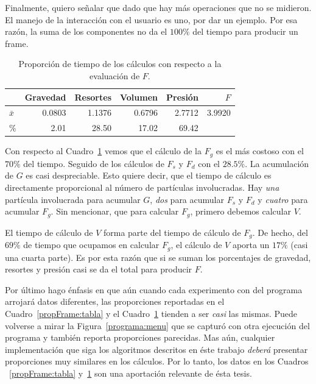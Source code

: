 Finalmente, quiero señalar que dado que hay más operaciones que no se midieron.
El manejo de la interacción con el usuario es uno, por dar un ejemplo.
Por esa razón, la suma de los componentes no da el $100\%$ del tiempo para producir un frame.

\begin{table}
\begin{center}
\begin{tabular} {@{}lrrrrr@{}}
\toprule
& Gravedad & Resortes & Volumen & Presión & $F$ \\ 
\midrule 
 $\bar{x}$      & 0.0803 & 1.1376 & 0.6796 & 2.7712 & 3.9920 \\
 $\%$           & 2.01 & 28.50 & 17.02 & 69.42 & \\
\bottomrule
\end{tabular}
\end{center}
\caption[Proporción de cálculos de $F$]{Proporción de tiempo de los cálculos con respecto a la evaluación de $F$.}
\label{propFuerza:tabla}
\end{table}

Con respecto al Cuadro~\ref{propFuerza:tabla} vemos que el cálculo de la $F_g$ es el más costoso con el $70\%$ del tiempo.
Seguido de los cálculos de $F_s$ y $F_d$ con el $28.5\%$.
La acumulación de $G$ es casi despreciable.
Esto quiere decir, que el tiempo de cálculo es directamente proporcional al número de partículas involucradas.
Hay \emph{una} partícula involucrada para acumular $G$, \emph{dos} para acumular $F_s$ y $F_d$ y \emph{cuatro} para acumular $F_g$.
Sin mencionar, que para calcular $F_g$, primero debemos calcular $V$.

El tiempo de cálculo de $V$ forma parte del tiempo de cálculo de $F_g$.
De hecho, del $69\%$ de tiempo que ocupamos en calcular $F_g$, el cálculo de $V$ aporta un $17\%$ (casi una cuarta parte).
Es por esta razón que si se suman los porcentajes de gravedad, resortes y presión casi se da el total para producir $F$.

Por último hago énfasis en que aún cuando cada experimento con del programa arrojará datos diferentes, las proporciones reportadas en el Cuadro~\ref{propFrame:tabla} y el  Cuadro~\ref{propFuerza:tabla} tienden a ser \emph{casi} las mismas.
Puede volverse a mirar la Figura~\ref{programa:menu} que se capturó con otra ejecución del programa y también reporta proporciones parecidas.
Mas aún, cualquier implementación que siga los algoritmos descritos en éste trabajo \emph{deberá} presentar proporciones muy similares en los cálculos.
Por lo tanto, los datos en los Cuadros ~\ref{propFrame:tabla} y~\ref{propFuerza:tabla} son una aportación relevante de ésta tesis.
